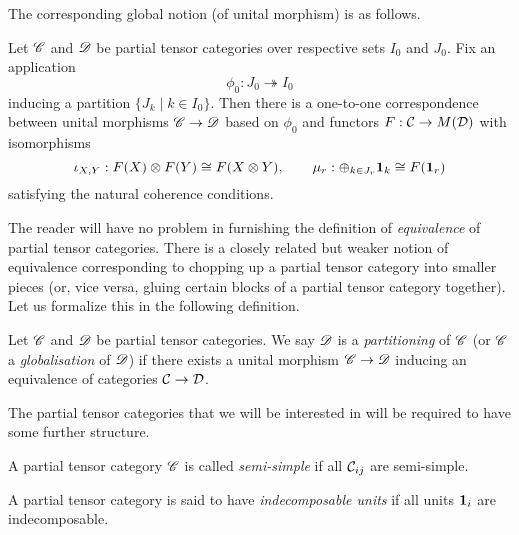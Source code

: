 The corresponding global notion (of unital morphism) is as follows.

\begin{Lem} Let $\mathscr{C}$ and $\mathscr{D}$ be partial tensor categories over respective sets $I_0$ and $J_0$. Fix an application \[\phi_0: J_0\twoheadrightarrow I_0\] inducing a partition $\{J_k\mid k\in I_0\}$. Then there is a one-to-one correspondence between unital morphisms $\mathscr{C}\rightarrow \mathscr{D}$ based on $\phi_0$ and functors $F:\mathcal{C} \rightarrow M(\mathcal{D})$ with isomorphisms \[\iota_{X,Y}:F(X)\otimes F(Y)\cong F(X\otimes Y),\qquad \mu_r:\oplus_{k\in J_r} \mathbf{1}_k \cong F(\mathbf{1}_r)\] satisfying the natural coherence conditions. 
\end{Lem} 

The reader will have no problem in furnishing the definition of \emph{equivalence} of partial tensor categories. There is a closely related but weaker notion of equivalence corresponding to chopping up a partial tensor category into smaller pieces (or, vice versa, gluing certain blocks of a partial tensor category together). Let us formalize this in the following definition.

\begin{Def} Let $\mathscr{C}$ and $\mathscr{D}$ be partial tensor categories. We say $\mathscr{D}$ is a \emph{partitioning} of $\mathscr{C}$ (or $\mathscr{C}$ a \emph{globalisation} of $\mathscr{D}$) if there exists a unital morphism $\mathscr{C}\rightarrow \mathscr{D}$ inducing an equivalence of categories $\mathcal{C}\rightarrow \mathcal{D}$.
\end{Def}

The partial tensor categories that we will be interested in will be required to have some further structure. 


\begin{Def} A partial tensor category $\mathscr{C}$ is called \emph{semi-simple} if all $\mathcal{C}_{ij}$ are semi-simple. 

A partial tensor category is said to have \emph{indecomposable units} if all units $\mathbf{1}_i$ are indecomposable. 
\end{Def}

